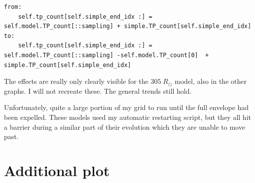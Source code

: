\documentclass[a4paper,10pt]{article}
\begin{document}
\begin{verbatim}
from:
    self.tp_count[self.simple_end_idx :] = self.model.TP_count[::sampling] + simple.TP_count[self.simple_end_idx]
to:
    self.tp_count[self.simple_end_idx :] = self.model.TP_count[::sampling] -self.model.TP_count[0]  + simple.TP_count[self.simple_end_idx]
\end{verbatim}

\begin{figure}[ht]
	\centering
\end{figure}

\begin{figure}[ht]
	\centering
\end{figure}

The effects are really only clearly visible for the \(305\; R_\odot \) model,
also in the other graphs.
I will not recreate these.
The general trends still hold.


Unfortunately, quite a large portion of my grid to run until the full envelope
had been expelled.
These models used my automatic restarting script, but they
all hit a barrier during a similar part of their evolution which they are
unable to move past.
\begin{figure}[ht]
	\centering
\end{figure}

\begin{figure}[ht]
	\centering
\end{figure}

\begin{figure}[ht]
	\centering
\end{figure}

\begin{figure}[ht]
	\centering
\end{figure}

\begin{figure}[ht]
	\centering
\end{figure}


\appendix
\section{Additional plot}
\begin{figure}[ht]
	\centering
\end{figure}
\end{document}
